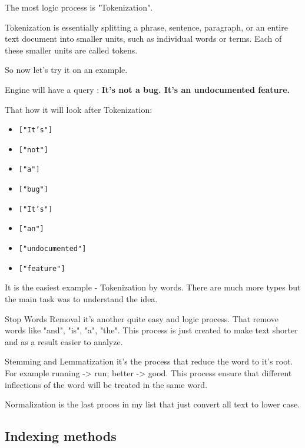\documentclass[10pt,a4paper]{article}
\begin{document}
The most logic process is "Tokenization".

Tokenization is essentially splitting a phrase, sentence, paragraph, or an entire text document into smaller units, such as individual words or terms. Each of these smaller units are called tokens.

So now let's try it on an example.

Engine will have a query : 
\textbf{It's not a bug. It's an undocumented feature.}

That how it will look after Tokenization:

\begin{center}
\begin{itemize}[label={}]
    \centering
    \item \texttt{["It's"]}
    \item \texttt{["not"]}
    \item \texttt{["a"]}
    \item \texttt{["bug"]}
    \item \texttt{["It's"]}
    \item \texttt{["an"]}
    \item \texttt{["undocumented"]}
    \item \texttt{["feature"]}
\end{itemize}
\end{center}

It is the easiest example - Tokenization by words. There are much more types but the main task was to understand the idea.

\hrulefill

Stop Words Removal it's another quite easy and logic process. That remove words like "and", "is", "a", "the". This process is just created to make text shorter and as a result easier to analyze.

\hrulefill

Stemming and Lemmatization it's the process that reduce the word to it's root. For example running -> run; better -> good. This process ensure that different inflections of the word will be treated in the same word.

\hrulefill

Normalization is the last proces in my list that just convert all text to lower case.

\hrulefill


\subsection{Indexing methods}
\end{document}
